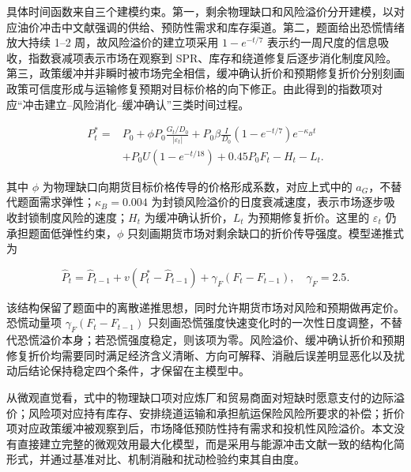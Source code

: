 具体时间函数来自三个建模约束。第一，剩余物理缺口和风险溢价分开建模，以对应油价冲击中文献强调的供给、预防性需求和库存渠道。第二，题面给出恐慌情绪放大持续 1--2 周，故风险溢价的建立项采用 \(1-e^{-t/7}\) 表示约一周尺度的信息吸收，指数衰减项表示市场在观察到 SPR、库存和绕道修复后逐步消化制度风险。第三，政策缓冲并非瞬时被市场完全相信，缓冲确认折价和预期修复折价分别刻画政策可信度形成与运输修复预期对目标价格的向下修正。由此得到的指数项对应“冲击建立--风险消化--缓冲确认”三类时间过程。

\begin{equation}
\begin{aligned}
  P_t^\ast
  ={}& P_0
  + \phi P_0 \frac{G_t/D_0}{|\varepsilon_t|}
  + P_0\beta\frac{I}{D_0}
    \left(1-e^{-t/7}\right)e^{-\kappa_B t} \\
  & + P_0U\left(1-e^{-t/18}\right)
  + 0.45P_0F_t
  - H_t - L_t .
\end{aligned}
\end{equation}

其中 $\phi$ 为物理缺口向期货目标价格传导的价格形成系数，对应上式中的 \(a_G\)，不替代题面需求弹性；$\kappa_B=0.004$ 为封锁风险溢价的日度衰减速度，表示市场逐步吸收封锁制度风险的速度；$H_t$ 为缓冲确认折价，$L_t$ 为预期修复折价。这里的 \(\varepsilon_t\) 仍承担题面低弹性约束，\(\phi\) 只刻画期货市场对剩余缺口的折价传导强度。模型递推式为

\begin{equation}
  \hat P_t
  =
  \hat P_{t-1}
  + v(P_t^\ast-\hat P_{t-1})
  + \gamma_F(F_t-F_{t-1}),\quad \gamma_F=2.5 .
\end{equation}

该结构保留了题面中的离散递推思想，同时允许期货市场对风险和预期做再定价。恐慌动量项 \(\gamma_F(F_t-F_{t-1})\) 只刻画恐慌强度快速变化时的一次性日度调整，不替代恐慌溢价本身；若恐慌强度稳定，则该项为零。风险溢价、缓冲确认折价和预期修复折价均需要同时满足经济含义清晰、方向可解释、消融后误差明显恶化以及扰动后结论保持稳定四个条件，才保留在主模型中。

从微观直觉看，式中的物理缺口项对应炼厂和贸易商面对短缺时愿意支付的边际溢价；风险项对应持有库存、安排绕道运输和承担航运保险风险所要求的补偿；折价项对应政策缓冲被观察到后，市场降低预防性持有需求和投机性风险溢价。本文没有直接建立完整的微观效用最大化模型，而是采用与能源冲击文献一致的结构化简形式，并通过基准对比、机制消融和扰动检验约束其自由度。

